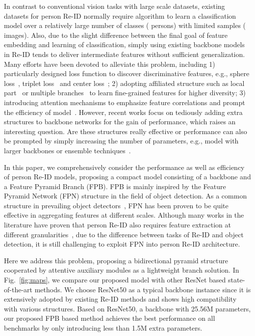 \documentclass[journal]{IEEEtran}
\begin{document}
In contrast to conventional vision tasks with large scale datasets, existing datasets for person Re-ID normally require algorithm to learn a classification model over a relatively large number of classes ( persons) with limited samples ( images).
Also, due to the slight difference between the final goal of feature embedding and learning of classification, simply using existing backbone models in Re-ID tends to deliver intermediate features without sufficient generalization.
Many efforts have been devoted to alleviate this problem, including 1) particularly designed loss function to discover discriminative features, e.g., sphere loss~\cite{fan2019spherereid}, triplet loss~\cite{hermans2017defense} and center loss~\cite{wen2016discriminative}; 2) adopting affiliated structure such as local part~\cite{sun2018beyond,9124699} or multiple branches~\cite{yang2019CAMA,zheng2019pyramidal,9351775} to learn fine-grained features for higher diversity; 3) introducing attention mechanisms to emphasize feature correlations and prompt the efficiency of model~\cite{chen2019ABD}.
However, recent works focus on tediously adding extra structures to backbone networks for the gain of performance, which raises an interesting question.
Are these structures really effective or performance can also be prompted by simply increasing the number of parameters, e.g., model with larger backbones or ensemble techniques~\cite{paisitkriangkrai2015learning}.

In this paper, we comprehensively consider the performance as well as efficiency of person Re-ID models, proposing a compact model consisting of a backbone and a Feature Pyramid Branch (FPB).
FPB is mainly inspired by the Feature Pyramid Network (FPN) structure in the field of object detection.
As a common structure in prevailing object detectors~\cite{8099589,9156454,bochkovskiy2020yolov4}, FPN has been proven to be quite effective in aggregating features at different scales.
Although many works in the literature have proven that person Re-ID also requires feature extraction at different granularities~\cite{sun2018beyond,wang2018parameter}, due to the difference between tasks of Re-ID and object detection, it is still challenging to exploit FPN into person Re-ID architecture.

Here we address this problem, proposing a bidirectional pyramid structure cooperated by attentive auxiliary modules as a lightweight branch solution.
In Fig.~\ref{fig:maps}, we compare our proposed model with other ResNet based state-of-the-art methods.
We choose ResNet50 as a typical backbone instance since it is extensively adopted by existing Re-ID methods and shows high compatibility with various structures.
Based on ResNet50, a backbone with 25.56M parameters, our proposed FPB based method achieves the best performance on all benchmarks by only introducing less than 1.5M extra parameters.
\end{document}

